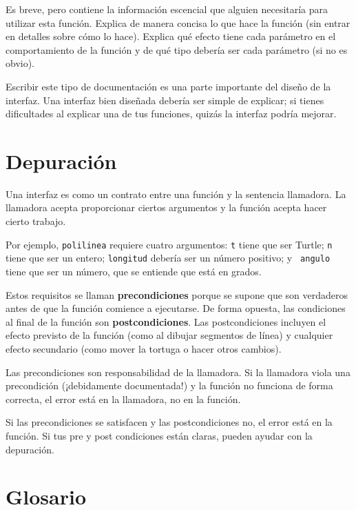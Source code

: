 \documentclass[10pt]{book}
\begin{document}
Es breve, pero contiene la información escencial
que alguien necesitaría para utilizar esta función.  Explica de manera concisa lo que
hace la función (sin entrar en detalles sobre cómo lo
hace).  Explica qué efecto tiene cada parámetro en el comportamiento de
la función y de qué tipo debería ser cada parámetro (si no es
obvio).

Escribir este tipo de documentación es una parte importante del diseño de la
interfaz.  Una interfaz bien diseñada debería ser simple de explicar;
si tienes dificultades al explicar una de tus funciones,
quizás la interfaz podría mejorar.


\section{Depuración}

Una interfaz es como un contrato entre una función y la sentencia llamadora.
La llamadora acepta proporcionar ciertos argumentos y la función
acepta hacer cierto trabajo.

Por ejemplo, {\tt polilinea} requiere cuatro argumentos: {\tt t} tiene que ser
Turtle; {\tt n} tiene que ser un
entero; {\tt longitud} debería ser un número positivo; y {\tt
  angulo} tiene que ser un número, que se entiende que está en grados.

Estos requisitos se llaman {\bf precondiciones} porque
se supone que son verdaderos antes de que la función comience a ejecutarse.
De forma opuesta, las condiciones al final de la función son
{\bf postcondiciones}.  Las postcondiciones incluyen el efecto
previsto de la función (como al dibujar segmentos de línea) y cualquier
efecto secundario (como mover la tortuga o hacer otros cambios).

Las precondiciones son responsabilidad de la llamadora.  Si la llamadora
viola una precondición (¡debidamente documentada!) y la función
no funciona de forma correcta, el error está en la llamadora, no en la función.

Si las precondiciones se satisfacen y las postcondiciones
no, el error está en la función.  Si tus pre y post condiciones
están claras, pueden ayudar con la depuración.


\section{Glosario}
\end{document}
